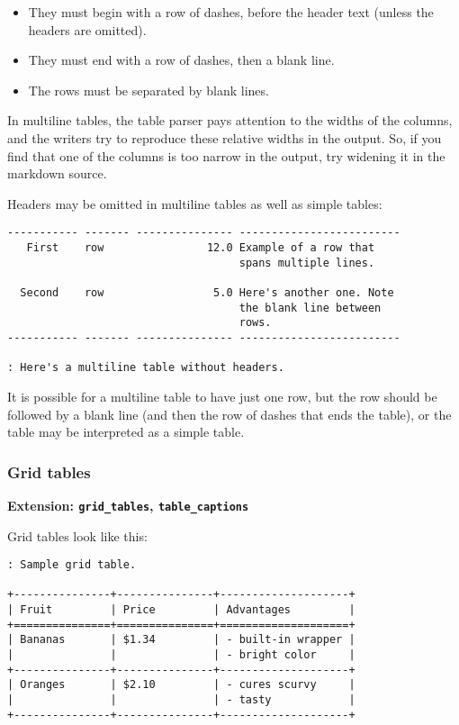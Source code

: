 \documentclass[]{article}
\begin{document}
\begin{itemize}
\itemsep1pt\parskip0pt
\item
  They must begin with a row of dashes, before the header text (unless
  the headers are omitted).
\item
  They must end with a row of dashes, then a blank line.
\item
  The rows must be separated by blank lines.
\end{itemize}

In multiline tables, the table parser pays attention to the widths of
the columns, and the writers try to reproduce these relative widths in
the output. So, if you find that one of the columns is too narrow in the
output, try widening it in the markdown source.

Headers may be omitted in multiline tables as well as simple tables:

\begin{verbatim}
----------- ------- --------------- -------------------------
   First    row                12.0 Example of a row that
                                    spans multiple lines.

  Second    row                 5.0 Here's another one. Note
                                    the blank line between
                                    rows.
----------- ------- --------------- -------------------------

: Here's a multiline table without headers.
\end{verbatim}

It is possible for a multiline table to have just one row, but the row
should be followed by a blank line (and then the row of dashes that ends
the table), or the table may be interpreted as a simple table.

\subsubsection{Grid tables}

\textbf{Extension: \texttt{grid\_tables}, \texttt{table\_captions}}

Grid tables look like this:

\begin{verbatim}
: Sample grid table.

+---------------+---------------+--------------------+
| Fruit         | Price         | Advantages         |
+===============+===============+====================+
| Bananas       | $1.34         | - built-in wrapper |
|               |               | - bright color     |
+---------------+---------------+--------------------+
| Oranges       | $2.10         | - cures scurvy     |
|               |               | - tasty            |
+---------------+---------------+--------------------+
\end{verbatim}
\end{document}
